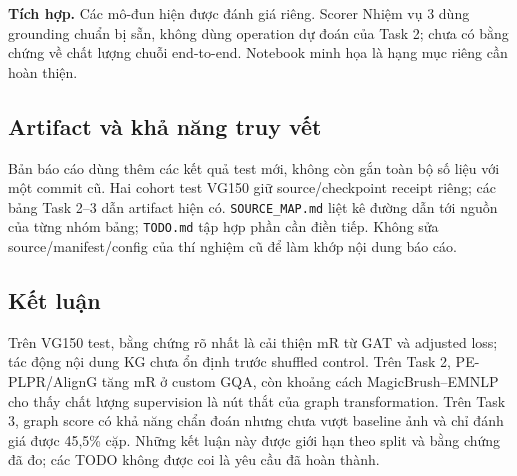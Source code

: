 \textbf{Tích hợp.} Các mô-đun hiện được đánh giá riêng. Scorer Nhiệm vụ 3 dùng
grounding chuẩn bị sẵn, không dùng operation dự đoán của Task 2; chưa có bằng chứng
về chất lượng chuỗi end-to-end. Notebook minh họa là hạng mục riêng cần hoàn thiện.

\subsection{Artifact và khả năng truy vết}
Bản báo cáo dùng thêm các kết quả test mới, không còn gắn toàn bộ số liệu với
một commit cũ. Hai cohort test VG150 giữ source/checkpoint receipt riêng;
các bảng Task 2--3 dẫn artifact hiện có. \texttt{SOURCE\_MAP.md} liệt kê đường
dẫn tới nguồn của từng nhóm bảng; \texttt{TODO.md} tập hợp phần cần điền tiếp.
Không sửa source/manifest/config của thí nghiệm cũ để làm khớp nội dung báo cáo.

\subsection{Kết luận}
Trên VG150 test, bằng chứng rõ nhất là cải thiện mR từ GAT và adjusted loss;
tác động nội dung KG chưa ổn định trước shuffled control. Trên Task 2,
PE-PLPR/AlignG tăng mR ở custom GQA, còn khoảng cách MagicBrush--EMNLP
cho thấy chất lượng supervision là nút thắt của graph transformation.
Trên Task 3, graph score có khả năng chẩn đoán nhưng chưa vượt baseline ảnh
và chỉ đánh giá được 45,5\% cặp. Những kết luận này được giới hạn theo
split và bằng chứng đã đo; các TODO không được coi là yêu cầu đã hoàn thành.
